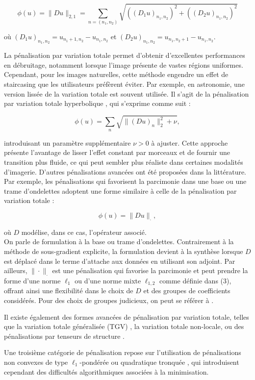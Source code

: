 \documentclass[a4paper, 12pt]{article} %
\begin{document}
\[
\phi(u) = \|Du\|_{2,1} = \sum_{n=(n_1,n_2)} \sqrt{((D_1 u)_{n_1,n_2})^2 + ((D_2 u)_{n_1,n_2})^2}
\]

où \((D_1 u)_{n_1,n_2} = u_{n_1+1,n_2} - u_{n_1,n_2}\) et \((D_2 u)_{n_1,n_2} = u_{n_1,n_2+1} - u_{n_1,n_2}\).

La pénalisation par variation totale permet d'obtenir d'excellentes performances en débruitage, notamment lorsque l'image présente de vastes régions uniformes. Cependant, pour les images naturelles, cette méthode engendre un effet de staircasing que les utilisateurs préfèrent éviter. Par exemple, en astronomie, une version lissée de la variation totale est souvent utilisée. Il s'agit de la pénalisation par variation totale hyperbolique \cite{6}, qui s'exprime comme suit :

\[
\phi(u) = \sum_{n} \sqrt{ \| (Du)_n \|_2^2 + \nu},
\]

introduisant un paramètre supplémentaire \(\nu > 0\) à ajuster. Cette approche présente l'avantage de lisser l'effet constant par morceaux et de fournir une transition plus fluide, ce qui peut sembler plus réaliste dans certaines modalités d'imagerie. D'autres pénalisations avancées ont été proposées dans la littérature. Par exemple, les pénalisations qui favorisent la parcimonie dans une base ou une trame d'ondelettes \cite{21,26} adoptent une forme similaire à celle de la pénalisation par variation totale :

\[
\phi(u) = \|Du\|_{\cdot},
\]

où \(D\) modélise, dans ce cas, l'opérateur associé.\\
On parle de formulation à la base ou trame d’ondelettes. Contrairement à la méthode de sous-gradient explicite, la formulation devient à la synthèse lorsque \(D\) est déplacé dans le terme d'attache aux données en utilisant son adjoint. Par ailleurs, \(\| \cdot \|_{\cdot}\) est une pénalisation qui favorise la parcimonie et peut prendre la forme d'une norme \(\ell_1\) ou d'une norme mixte \(\ell_{1,2}\) comme définie dans (3), offrant ainsi une flexibilité dans le choix de \(D\) et des groupes de coefficients considérés. Pour des choix de groupes judicieux, on peut se référer à \cite{2}. 

Il existe également des formes avancées de pénalisation par variation totale, telles que la variation totale généralisée (TGV) \cite{4}, la variation totale non-locale, ou des pénalisations par tenseurs de structure \cite{8}. 

Une troisième catégorie de pénalisation repose sur l’utilisation de pénalisations non convexes de type \(\ell_1\)-pondérée ou quadratique tronquée \cite{24}, qui introduisent cependant des difficultés algorithmiques associées à la minimisation. 
\end{document}
